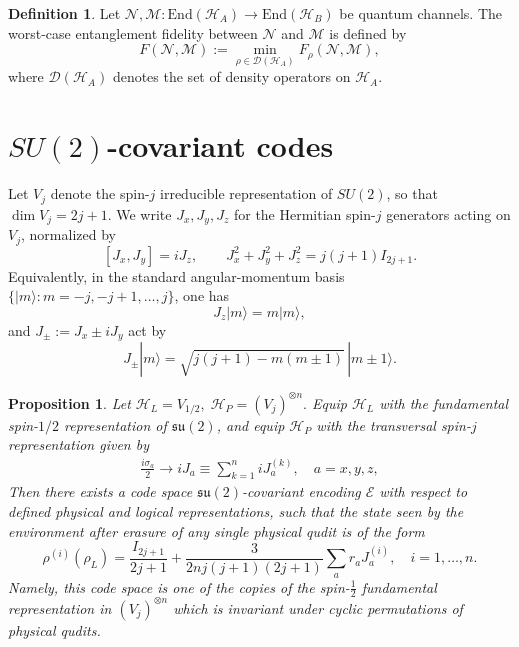 \documentclass[10pt,twocolumn,superscriptaddress,aps,amsmath,amssymb,citeautoscript,floatfix,prx]{revtex4-2}
\theoremstyle{plain}
\theoremstyle{plain}
\theoremstyle{plain}
\theoremstyle{plain}
\theoremstyle{plain}
\theoremstyle{plain}
\newcommand{\End}{\mathrm{End}}
\theoremstyle{plain}
\newtheorem{smproposition}[smtheorem]{Proposition}
\theoremstyle{definition}
\newtheorem{smdefinition}[smtheorem]{Definition}
\theoremstyle{plain}
\begin{document}
\begin{appendix}
\begin{smdefinition}\label{def:worst_case_entanglement_fidelity}
Let
$
    \mathcal N,\mathcal M:\End(\mathcal H_A)\to \End(\mathcal H_B)
$
be quantum channels. The worst-case entanglement fidelity between \(\mathcal N\) and \(\mathcal M\) is defined by
\[
    F(\mathcal N,\mathcal M)
    :=
    \min_{\rho\in\mathcal D(\mathcal H_A)}
    F_\rho(\mathcal N,\mathcal M),
\]
where \(\mathcal D(\mathcal H_A)\) denotes the set of density operators on \(\mathcal H_A\).
\end{smdefinition}

\section{\texorpdfstring{$SU(2)$}{SU(2)}-covariant codes}\label{sec:supple_su2}

Let \(V_j\) denote the spin-\(j\) irreducible representation of \(SU(2)\), so that
$
    \dim V_j=2j+1.
$
We write \(J_x,J_y,J_z\) for the Hermitian spin-\(j\) generators acting on \(V_j\), normalized by
\begin{equation}\label{eq:spinj}
    [J_x,J_y]=iJ_z,
    \qquad
    J_x^2+J_y^2+J_z^2=j(j+1)I_{2j+1}.
\end{equation}
Equivalently, in the standard angular-momentum basis
\(\{|m\rangle:m=-j,-j+1,\ldots,j\}\), one has
\begin{equation}\label{eq:Jz}
    J_z|m\rangle=m|m\rangle,
\end{equation}
and \(J_\pm:=J_x\pm iJ_y\) act by
\begin{equation}\label{eq:Jpm}
    J_\pm |m\rangle
    =
    \sqrt{j(j+1)-m(m\pm1)}\,|m\pm1\rangle .
\end{equation}

\begin{smproposition}\label{prop:SU2cov}
    Let
    $
        \mathcal H_L=V_{1/2},\;
        \mathcal H_P=(V_j)^{\otimes n}.
    $
    Equip \(\mathcal H_L\) with the fundamental spin-\(1/2\) representation of
    \(\mathfrak{su}(2)\), and equip \(\mathcal H_P\) with the transversal spin-\(j\)
    representation given by
    \begin{equation}
    \begin{gathered}
    \frac{i \sigma_a}{2} \rightarrow i J_a \equiv \sum_{k=1}^n i J_a^{(k)}, \quad a=x, y, z,
    \end{gathered}
    \end{equation} 
    Then there exists a code space $\mathfrak{su}(2)$-covariant encoding $\mathcal{E}$ with respect to defined physical and logical representations,
    such that the state seen by the environment after erasure of any single physical qudit is of the form
    \begin{equation}\label{eq:reducedStateSU2}
        \rho^{(i)}\left(\rho_L\right)=\frac{I_{2 j+1}}{2 j+1}+\frac{3}{2 n j(j+1)(2 j+1)} \sum_a r_a J_a^{(i)}, \quad i=1, \ldots, n.
    \end{equation}
    Namely, this code space is one of the copies of the spin-$\frac{1}{2}$ fundamental representation in $\left(V_j\right)^{\otimes n}$ which is invariant under cyclic permutations of physical qudits.
    

\end{smproposition}
\end{appendix}
\end{document}
